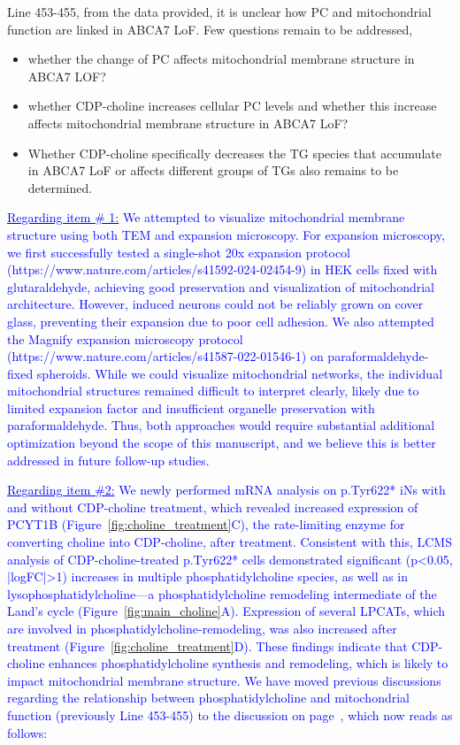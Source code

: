Line 453-455, from the data provided, it is unclear how PC and mitochondrial function are linked in ABCA7 LoF. Few questions remain to be addressed,
\begin{itemize}
	\item whether the change of PC affects mitochondrial membrane structure in ABCA7 LOF?

	\item whether CDP-choline increases cellular PC levels and whether this increase affects mitochondrial membrane structure in ABCA7 LoF?
	
	\item Whether CDP-choline specifically decreases the TG species that accumulate in ABCA7 LoF or affects different groups of TGs also remains to be determined.
\end{itemize}

\textcolor{blue}{\underline{Regarding item \# 1:} We attempted to visualize mitochondrial membrane structure using both TEM and expansion microscopy. For expansion microscopy, we first successfully tested a single-shot 20x expansion protocol (https://www.nature.com/articles/s41592-024-02454-9) in HEK cells fixed with glutaraldehyde, achieving good preservation and visualization of mitochondrial architecture. However, induced neurons could not be reliably grown on cover glass, preventing their expansion due to poor cell adhesion. We also attempted the Magnify expansion microscopy protocol (https://www.nature.com/articles/s41587-022-01546-1) on paraformaldehyde-fixed spheroids. While we could visualize mitochondrial networks, the individual mitochondrial structures remained difficult to interpret clearly, likely due to limited expansion factor and insufficient organelle preservation with paraformaldehyde. Thus, both approaches would require substantial additional optimization beyond the scope of this manuscript, and we believe this is better addressed in future follow-up studies.}

\textcolor{blue}{\underline{Regarding item \#2:} We newly performed mRNA analysis on p.Tyr622* iNs with and without CDP-choline treatment, which revealed increased expression of PCYT1B (Figure~\ref{fig:choline_treatment}C), the rate-limiting enzyme for converting choline into CDP-choline\cite{Lykidis1998-rj}, after treatment. Consistent with this, LCMS analysis of CDP-choline-treated p.Tyr622* cells demonstrated significant (p<0.05, |logFC|>1) increases in multiple phosphatidylcholine species, as well as in lysophosphatidylcholine—a phosphatidylcholine remodeling intermediate of the Land’s cycle (Figure~\ref{fig:main_choline}A). Expression of several LPCATs, which are involved in phosphatidylcholine-remodeling, was also increased  after treatment (Figure~\ref{fig:choline_treatment}D). These findings indicate that CDP-choline enhances phosphatidylcholine synthesis and remodeling, which is likely to impact mitochondrial membrane structure. We have moved previous discussions regarding the relationship between phosphatidylcholine and mitochondrial function (previously Line 453-455) to the discussion on page~\pageref{quoteI-label}, which now reads as follows:}

